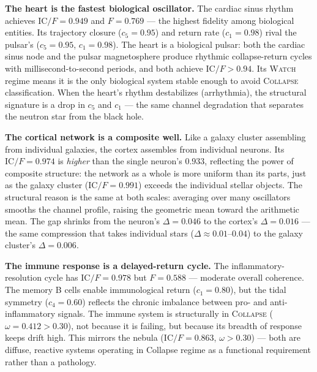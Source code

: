 \documentclass[
  aps,
  prd,
  twocolumn,
  superscriptaddress,
  nofootinbib,
  floatfix
]{revtex4-2}
\newcommand{\regime}[1]{\textrm{\upshape\scshape#1}}
\newcommand{\IC}{\mathrm{IC}}
\begin{document}
\textbf{The heart is the fastest biological oscillator.}
The cardiac sinus rhythm achieves $\IC/F = 0.949$ and
$F = 0.769$ --- the highest fidelity among biological
entities.  Its trajectory closure ($c_5 = 0.95$) and
return rate ($c_1 = 0.98$) rival the pulsar's ($c_5 = 0.95$,
$c_1 = 0.98$).  The heart is a biological pulsar: both
the cardiac sinus node and the pulsar magnetosphere produce
rhythmic collapse-return cycles with millisecond-to-second
periods, and both achieve $\IC/F > 0.94$.
Its \regime{Watch} regime means it is the only biological
system stable enough to avoid \regime{Collapse}
classification.  When the heart's rhythm destabilizes
(arrhythmia), the structural signature is a drop in $c_5$
and $c_1$ --- the same channel degradation that separates
the neutron star from the black hole.

\textbf{The cortical network is a composite well.}
Like a galaxy cluster assembling from individual galaxies,
the cortex assembles from individual neurons.  Its
$\IC/F = 0.974$ is \emph{higher} than the single neuron's
$0.933$, reflecting the power of composite structure: the
network as a whole is more uniform than its parts, just as
the galaxy cluster ($\IC/F = 0.991$) exceeds the individual
stellar objects.  The structural reason is the same at both
scales: averaging over many oscillators smooths the channel
profile, raising the geometric mean toward the arithmetic
mean.  The gap shrinks from the neuron's $\Delta = 0.046$ to
the cortex's $\Delta = 0.016$ --- the same compression that
takes individual stars ($\Delta \approx 0.01$--$0.04$) to
the galaxy cluster's $\Delta = 0.006$.

\textbf{The immune response is a delayed-return cycle.}
The inflammatory-resolution cycle has $\IC/F = 0.978$ but
$F = 0.588$ --- moderate overall coherence.  The memory B
cells enable immunological return ($c_1 = 0.80$), but the
tidal symmetry ($c_4 = 0.60$) reflects the chronic
imbalance between pro- and anti-inflammatory signals.
The immune system is structurally in \regime{Collapse}
($\omega = 0.412 > 0.30$), not because it is failing, but
because its breadth of response keeps drift high.  This
mirrors the nebula ($\IC/F = 0.863$, $\omega > 0.30$) ---
both are diffuse, reactive systems operating in Collapse
regime as a functional requirement rather than a pathology.
\end{document}
